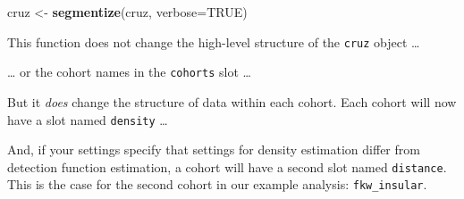 \documentclass[
]{book}
\newenvironment{Shaded}{\begin{snugshade}}{\end{snugshade}}
\newcommand{\DataTypeTok}[1]{\textcolor[rgb]{0.13,0.29,0.53}{#1}}
\newcommand{\DecValTok}[1]{\textcolor[rgb]{0.00,0.00,0.81}{#1}}
\newcommand{\KeywordTok}[1]{\textcolor[rgb]{0.13,0.29,0.53}{\textbf{#1}}}
\newcommand{\NormalTok}[1]{#1}
\newcommand{\OperatorTok}[1]{\textcolor[rgb]{0.81,0.36,0.00}{\textbf{#1}}}
\newcommand{\OtherTok}[1]{\textcolor[rgb]{0.56,0.35,0.01}{#1}}
\newcommand{\StringTok}[1]{\textcolor[rgb]{0.31,0.60,0.02}{#1}}
\begin{document}
\begin{Shaded}
\begin{Highlighting}[]
\NormalTok{cruz <-}\StringTok{ }\KeywordTok{segmentize}\NormalTok{(cruz, }\DataTypeTok{verbose=}\OtherTok{TRUE}\NormalTok{)}
\end{Highlighting}
\end{Shaded}

This function does not change the high-level structure of the \texttt{cruz} object \ldots{}

\begin{Shaded}
\end{Shaded}

\ldots{} or the cohort names in the \texttt{cohorts} slot \ldots{}

\begin{Shaded}
\end{Shaded}

But it \emph{does} change the structure of data within each cohort. Each cohort will now have a slot named \texttt{density} \ldots{}

\begin{Shaded}
\end{Shaded}

And, if your settings specify that settings for density estimation differ from detection function estimation, a cohort will have a second slot named \texttt{distance}. This is the case for the second cohort in our example analysis: \texttt{fkw\_insular}.

\begin{Shaded}
\end{Shaded}
\end{document}
